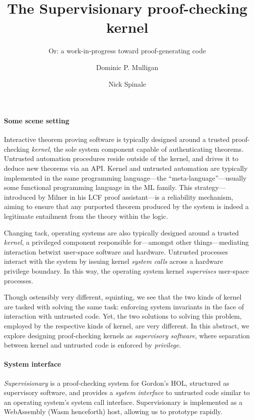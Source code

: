 \documentclass[sigplan, review]{acmart}
\title{The Supervisionary proof-checking kernel}
\subtitle{Or: a work-in-progress toward proof-generating code}
\author{Dominic P. Mulligan}
\affiliation{
  \institution{Systems Research Group, Arm Research}
  \streetaddress{Fulbourn Road}
  \city{Cambridge}
  \country{United Kingdom}
}
\author{Nick Spinale}
\affiliation{
  \institution{Systems Research Group, Arm Research}
  \streetaddress{Fulbourn Road}
  \city{Cambridge}
  \country{United Kingdom}
}
\begin{document}
\maketitle

\paragraph{Some scene setting}

Interactive theorem proving software is typically designed around a trusted proof-checking \emph{kernel}, the sole system component capable of authenticating theorems.
Untrusted automation procedures reside outside of the kernel, and drives it to deduce new theorems via an API.
Kernel and untrusted automation are typically implemented in the same programming language---the ``meta-language''---usually some functional programming language in the ML family.
This strategy---introduced by Milner in his LCF proof assistant---is a reliability mechanism, aiming to ensure that any purported theorem produced by the system is indeed a legitimate entailment from the theory within the logic.

Changing tack, operating systems are also typically designed around a trusted \emph{kernel}, a privileged component responsible for---amongst other things---mediating interaction betwixt user-space software and hardware.
Untrusted processes interact with the system by issuing kernel \emph{system calls} across a hardware privilege boundary.
In this way, the operating system kernel \emph{supervises} user-space processes.

Though ostensibly very different, squinting, we see that the two kinds of kernel are tasked with solving the same task: enforcing system invariants in the face of interaction with untrusted code.
Yet, the two solutions to solving this problem, employed by the respective kinds of kernel, are very different.
In this abstract, we explore designing proof-checking kernels as \emph{supervisory software}, where separation between kernel and untrusted code is enforced by \emph{privilege}.

\paragraph{System interface}

\emph{Supervisionary} is a proof-checking system for Gordon's HOL, structured as supervisory software, and provides a \emph{system interface} to untrusted code similar to an operating system's system call interface.
Supervisionary is implemented as a WebAssembly (Wasm henceforth) host, allowing us to prototype rapidly.
\end{document}
